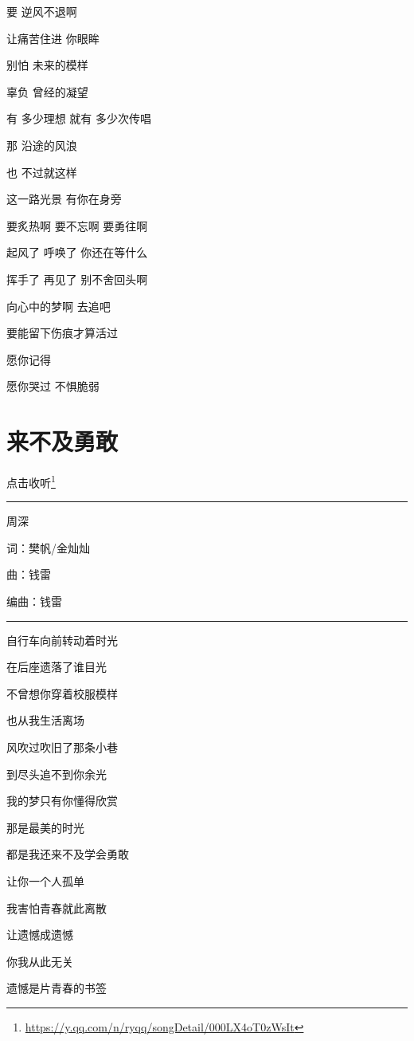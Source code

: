 \documentclass[]{ctexbook}
\renewcommand{\href}[2]{#2\footnote{\url{#1}}}
\begin{document}
要 逆风不退啊

让痛苦住进 你眼眸

别怕 未来的模样

辜负 曾经的凝望

有 多少理想 就有 多少次传唱

那 沿途的风浪

也 不过就这样

这一路光景 有你在身旁

要炙热啊 要不忘啊 要勇往啊

起风了 呼唤了 你还在等什么

挥手了 再见了 别不舍回头啊

向心中的梦啊 去追吧

要能留下伤痕才算活过

愿你记得

愿你哭过 不惧脆弱

\section*{来不及勇敢}\label{late-to-be-brave}


\href{https://y.qq.com/n/ryqq/songDetail/000LX4oT0zWsIt}{点击收听}

\begin{center}\rule{0.5\linewidth}{0.5pt}\end{center}

周深

词：樊帆/金灿灿

曲：钱雷

编曲：钱雷

\begin{center}\rule{0.5\linewidth}{0.5pt}\end{center}

自行车向前转动着时光

在后座遗落了谁目光

不曾想你穿着校服模样

也从我生活离场

风吹过吹旧了那条小巷

到尽头追不到你余光

我的梦只有你懂得欣赏

那是最美的时光

都是我还来不及学会勇敢

让你一个人孤单

我害怕青春就此离散

让遗憾成遗憾

你我从此无关

遗憾是片青春的书签
\end{document}
